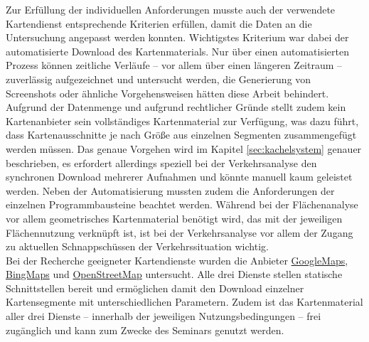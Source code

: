 Zur Erfüllung der individuellen Anforderungen musste auch der verwendete Kartendienst entsprechende Kriterien erfüllen, damit die Daten an die Untersuchung angepasst werden konnten.  Wichtigstes Kriterium war dabei der automatisierte Download des Kartenmaterials. Nur über einen automatisierten Prozess können zeitliche Verläufe -- vor allem über einen längeren Zeitraum -- zuverlässig aufgezeichnet und untersucht werden, die Generierung von Screenshots oder ähnliche Vorgehensweisen hätten diese Arbeit behindert. Aufgrund der Datenmenge und aufgrund rechtlicher Gründe stellt zudem kein Kartenanbieter sein vollständiges Kartenmaterial zur Verfügung, was dazu führt, dass Kartenausschnitte je nach Größe aus einzelnen Segmenten zusammengefügt werden müssen. Das genaue Vorgehen wird im Kapitel \ref{sec:kachelsystem} genauer beschrieben, es erfordert allerdings speziell bei der Verkehrsanalyse den synchronen Download mehrerer Aufnahmen und könnte manuell kaum geleistet werden. Neben der Automatisierung mussten zudem die Anforderungen der einzelnen Programmbausteine beachtet werden. Während bei der Flächenanalyse vor allem geometrisches Kartenmaterial benötigt wird, das mit der jeweiligen Flächennutzung verknüpft ist, ist bei der Verkehrsanalyse vor allem der Zugang zu aktuellen Schnappschüssen der Verkehrssituation wichtig.\\

Bei der Recherche geeigneter Kartendienste wurden die Anbieter \href{https://www.google.de/maps/}{GoogleMaps}, \href{https://www.bing.com/maps/}{BingMaps} und \href{http://www.openstreetmap.org/}{OpenStreetMap} untersucht. Alle drei Dienste stellen statische Schnittstellen bereit und ermöglichen damit den Download einzelner Kartensegmente mit unterschiedlichen Parametern. Zudem ist das Kartenmaterial aller drei Dienste -- innerhalb der jeweiligen Nutzungsbedingungen -- frei zugänglich und kann zum Zwecke des Seminars genutzt werden.\\

